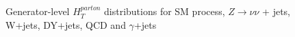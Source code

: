 \begin{figure}[!h]
\begin{center}
     \\
     ~~
    \caption{Generator-level $H_{T}^{parton}$ distributions for SM process, $Z\rightarrow \nu\nu$ + jets, W+jets, DY+jets, QCD and $\gamma$+jets}
    \label{fig:Lhe_Ht}
  \end{center}
\end{figure}

